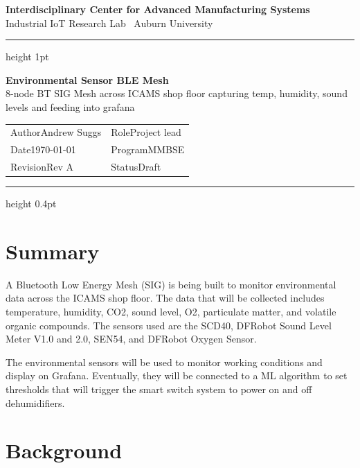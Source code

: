 \documentclass[11pt,letterpaper]{article}
\newcommand{\orgName}{Interdisciplinary Center for Advanced Manufacturing Systems}
\newcommand{\orgSub}{Industrial IoT Research Lab \textbullet\ Auburn University}
\newcommand{\docTitle}{Environmental Sensor BLE Mesh}
\newcommand{\docSubtitle}{8-node BT SIG Mesh across ICAMS shop floor capturing temp, humidity, sound levels and feeding into grafana}
\newcommand{\reqName}{Andrew Suggs}
\newcommand{\reqDate}{\today}
\newcommand{\reqRole}{Project lead}
\newcommand{\reqProgram}{MMBSE}
\newcommand{\docRev}{Rev A}
\newcommand{\docStatus}{Draft}
\newcommand{\metaline}[2]{\textsf{\footnotesize\color{soft}#1}\quad #2}
\begin{document}
	
	{\sffamily\bfseries\large\orgName}\\[1pt]
	{\sffamily\footnotesize\color{soft}\orgSub}
	
	\vspace{4pt}
	{\color{rule}\hrule height 1pt}
	\vspace{10pt}
	
	{\sffamily\bfseries\LARGE\docTitle}\\[3pt]
	{\sffamily\normalsize\color{soft}\docSubtitle}
	
	\vspace{10pt}
	
	\begin{tabularx}{\textwidth}{@{}XX@{}}
		\metaline{Author}{\reqName} & \metaline{Role}{\reqRole} \\
		\metaline{Date}{\reqDate} & \metaline{Program}{\reqProgram} \\
		\metaline{Revision}{\docRev} & \metaline{Status}{\docStatus} \\
	\end{tabularx}
	
	\vspace{6pt}
	{\color{rule}\hrule height 0.4pt}
	
	\section{Summary}
	
	A Bluetooth Low Energy Mesh (SIG) is being built to monitor environmental data across the ICAMS shop floor. The data that will be collected includes temperature, humidity, CO2, sound level, O2, particulate matter, and volatile organic compounds. The sensors used are the SCD40, DFRobot Sound Level Meter V1.0 and 2.0, SEN54, and DFRobot Oxygen Sensor.
	
	The environmental sensors will be used to monitor working conditions and display on Grafana. Eventually, they will be connected to a ML algorithm to set thresholds that will trigger the smart switch system to power on and off dehumidifiers.
	
	\section{Background}
	
\end{document}
